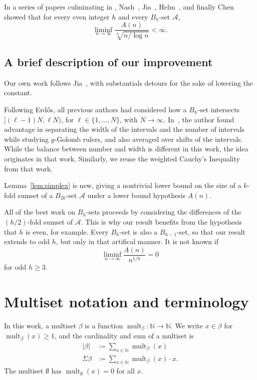 \documentclass[10pt,letterpaper]{article}
\newcommand{\NN}{\ensuremath{\mathbb N}}
\newcommand{\cA}{\mathcal{A}}
\DeclareMathOperator{\mult}{mult}
\theoremstyle{remark}
\begin{document}
In a series of papers culminating in \cite{1993.Chen}, Nash~\cite{1989.Nash}, Jia~, Helm~, and finally Chen~ showed that for every even integer $h$ and every $B_h$-set $\cA$,
  \[\liminf_{n\to\infty} \frac{A(n)}{\sqrt[h]{n/\log n}} < \infty.\]

\subsection{A brief description of our improvement}
Our own work follows Jia~\cite{1994.Jia}, with substantials detours for the sake of lowering the constant.

Following Erd\H{o}s, all previous authors had considered how a $B_h$-set intersects $[(\ell-1)N,\ell N)$, for $\ell\in \{1,\dots,N\}$, with $N\to \infty$. In~\cite{2026.Obryant-a}, the author found advantage in separating the width of the intervals and the number of intervals while studying $g$-Golomb rulers, and also averaged over shifts of the intervals. While the balance between number and width is different in this work, the idea originates in that work. Similarly, we reuse the weighted Cauchy's Inequality from that work. 

Lemma~\ref{lem:simplex} is new, giving a nontrivial lower bound on the size of a $k$-fold sumset of a $B_{2k}$-set $\cA$ under a lower bound hypothesis $A(n)$. 

All of the best work on $B_h$-sets proceeds by considering the differences of the $(h/2)$-fold sumset of $\cA$. 
This is why our result benefits from the hypothesis that $h$ is even, for example. 
Every $B_h$-set is also a $B_{h-1}$-set, so that our result extends to odd $h$, but only in that artifical manner. It is not known if
  \[\liminf_{n\to\infty} \frac{A(n)}{n^{1/h}} = 0 \]
for odd $h\ge 3$.

\section{Multiset notation and terminology}
In this work, a multiset $\beta$ is a function $\mult_\beta:\NN\to \NN$. 
We write $x\in \beta$ for $\mult_\beta(x) \ge 1$, and the cardinality and sum of a multiset is
\begin{align*}
  |\beta| & \coloneqq \sum_{x\in\NN} \mult_\beta(x) \\
  \Sigma \beta & \coloneqq \sum_{x\in \NN} \mult_\beta(x) \cdot x .
\end{align*}
The multiset $\emptyset$ has $\mult_\emptyset(x) = 0$ for all $x$.
\end{document}
